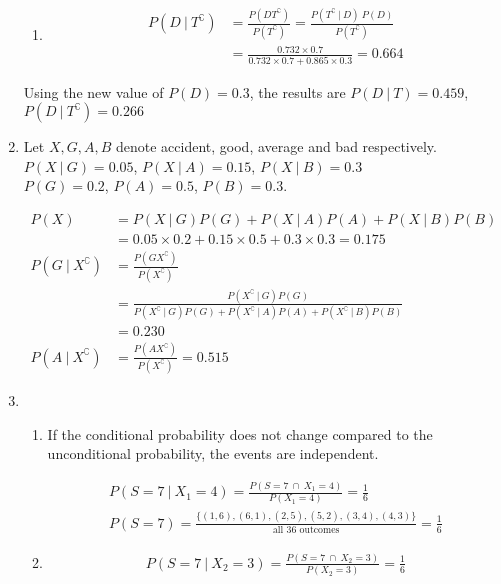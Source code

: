 \begin{enumerate}
\begin{enumerate}
		\item \begin{align}
			P(D\ |\ T^\complement) &= \frac{P(DT^\complement)}{P(T^\complement)} = \frac{P(T^\complement\ |\ D) \ P(D)}{P(T^\complement)} \\
			&= \frac{0.732 \times 0.7}{0.732 \times 0.7 + 0.865 \times 0.3} = 0.664
		\end{align}
	\end{enumerate}
	
	Using the new value of $ P(D) = 0.3 $, the results are
	$ P(D\ |\ T) =  0.459$, $ P(D\ |\ T^\complement) = 0.266$\\
	
	\item Let $ X, G, A, B $ denote accident, good, average and bad respectively.
	$ P(X\ |\ G) = 0.05 $, $ P(X\ |\ A) = 0.15 $, $ P(X\ |\ B) = 0.3 $ \\
	$ P(G) = 0.2 $, $ P(A) = 0.5 $, $ P(B) = 0.3 $.
	
		\begin{align}
			P(X) &= P(X\ |\ G) P(G) + P(X\ |\ A) P(A) + P(X\ |\ B) P(B) \\
			&= 0.05 \times 0.2 + 0.15 \times 0.5 + 0.3 \times 0.3 = 0.175 \\
			P(G\ |\ X^\complement) &= \frac{P(G X^\complement)}{P(X^\complement)} \\
			&= \frac{P(X^\complement \ |\ G)P(G)}{P(X^\complement \ |\ G)P(G) + P(X^\complement \ |\ A)P(A) +P(X^\complement \ |\ B)P(B)} \\
			&= 0.230 \\
			P(A\ |\ X^\complement) &= \frac{P(A X^\complement)}{P(X^\complement)} = 0.515
		\end{align}
	
	
	\item \begin{enumerate}
		\item If the conditional probability does not change compared to the unconditional probability, the events are independent.
		
		
			\begin{align}
				P(S = 7 \ |\ X_1 = 4) = \frac{P(S = 7 \ \cap\ X_1 = 4)}{P(X_1 = 4)} = \frac{1}{6} \\
				P(S = 7) = \frac{\{ (1,6), (6,1), (2,5), (5,2), (3,4), (4,3) \}}{\text{all 36 outcomes}} = \frac{1}{6}
			\end{align}
			
			\item \begin{align}
				P(S = 7 \ |\ X_2 = 3) = \frac{P(S = 7 \ \cap\ X_2 = 3)}{P(X_2 = 3)} = \frac{1}{6}
			\end{align}
		

\end{enumerate}
\end{enumerate}
